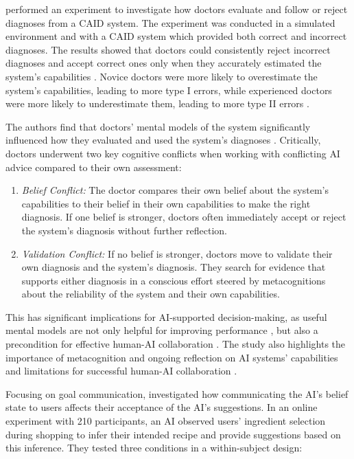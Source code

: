 \textcite{Jussupow2021} performed an experiment to investigate how doctors evaluate and follow or reject diagnoses from a \ac{CAID} system. The experiment was conducted in a simulated environment and with a \ac{CAID} system which provided both correct and incorrect diagnoses. The results showed that doctors could consistently reject incorrect diagnoses and accept correct ones only when they accurately estimated the system's capabilities \parencite{Jussupow2021}. Novice doctors were more likely to overestimate the system's capabilities, leading to more type I errors, while experienced doctors were more likely to underestimate them, leading to more type II errors \parencite{Jussupow2021}.

The authors find that doctors' mental models of the system significantly influenced how they evaluated and used the system's diagnoses \parencite{Jussupow2021}. Critically, doctors underwent two key cognitive conflicts when working with conflicting \ac{AI} advice compared to their own assessment:

\begin{enumerate}
    \item \textit{Belief Conflict:} The doctor compares their own belief about the system's capabilities to their belief in their own capabilities to make the right diagnosis. If one belief is stronger, doctors often immediately accept or reject the system's diagnosis without further reflection.
    \item \textit{Validation Conflict:} If no belief is stronger, doctors move to validate their own diagnosis and the system's diagnosis. They search for evidence that supports either diagnosis in a conscious effort steered by metacognitions about the reliability of the system and their own capabilities.
\end{enumerate}

This has significant implications for \ac{AI}-supported decision-making, as useful mental models are not only helpful for improving performance \parencite{Weisz2025}, but also a precondition for effective human-AI collaboration \parencite{Jussupow2021}. The study also highlights the importance of metacognition and ongoing reflection on \ac{AI} systems' capabilities and limitations for successful human-AI collaboration \parencite{Jussupow2021}.

Focusing on goal communication, \textcite{Ying2024} investigated how communicating the \ac{AI}'s belief state to users affects their acceptance of the \ac{AI}'s suggestions. In an online experiment with 210 participants, an \ac{AI} observed users' ingredient selection during shopping to infer their intended recipe and provide suggestions based on this inference. They tested three conditions in a within-subject design:

